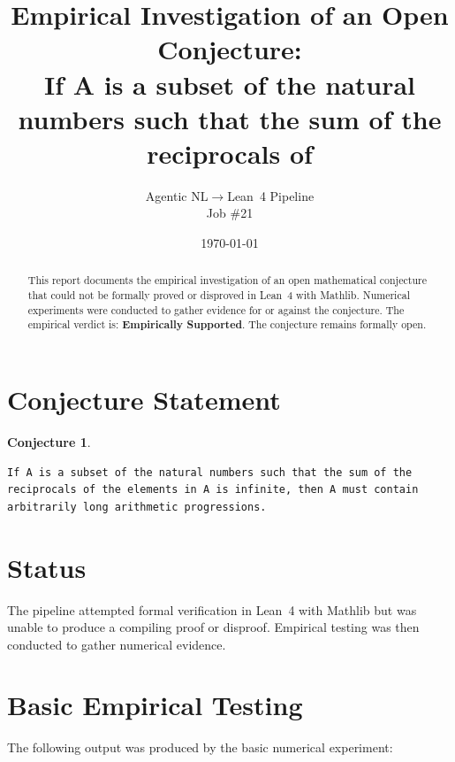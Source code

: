 \documentclass[11pt]{article}
\title{Empirical Investigation of an Open Conjecture:\\
If A is a subset of the natural numbers such that the sum of the reciprocals of }
\author{Agentic NL$\to$Lean~4 Pipeline \\ \small Job \#21}
\date{\today}
\newtheorem{conjecture}{Conjecture}
\begin{document}
\maketitle

\begin{abstract}
This report documents the empirical investigation of an open mathematical conjecture
that could not be formally proved or disproved in Lean~4 with Mathlib.
Numerical experiments were conducted to gather evidence for or against the conjecture.
The empirical verdict is: \textbf{\textcolor{green!70!black}{Empirically Supported}}.
The conjecture remains formally open.
\end{abstract}

\section{Conjecture Statement}

\begin{conjecture}
\begin{lstlisting}
If A is a subset of the natural numbers such that the sum of the reciprocals of the elements in A is infinite, then A must contain arbitrarily long arithmetic progressions.
\end{lstlisting}
\end{conjecture}

\section{Status}

\begin{center}
\end{center}

The pipeline attempted formal verification in Lean~4 with Mathlib but was unable to
produce a compiling proof or disproof. Empirical testing was then conducted to gather
numerical evidence.

\section{Basic Empirical Testing}

The following output was produced by the basic numerical experiment:
\end{document}
